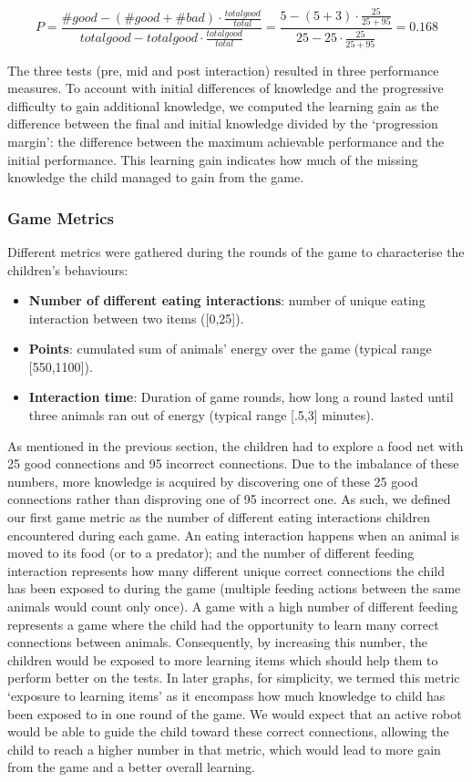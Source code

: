 \begin{equation}
P=\frac{\#good-(\#good+\#bad) \cdot \frac{total good}{total}}{total good - total good \cdot \frac{total good}{total}} = \frac{5-(5+3) \cdot \frac{25}{25+95}}{25 - 25 \cdot \frac{25}{25+95}}=0.168
\end{equation}
			
The three tests (pre, mid and post interaction) resulted in three performance measures. To account with initial differences of knowledge and the progressive difficulty to gain additional knowledge, we computed the learning gain as the difference between the final and initial knowledge divided by the `progression margin': the difference between the maximum achievable performance and the initial performance. This learning gain indicates how much of the missing knowledge the child managed to gain from the game.
			
\subsubsection{Game Metrics}
Different metrics were gathered during the rounds of the game to characterise the children's behaviours:
\begin{itemize}
	\item \textbf{Number of different eating interactions}: number of unique eating interaction between two items ([0,25]).
	\item \textbf{Points}: cumulated sum of animals' energy over the game (typical range [550,1100]).
	\item \textbf{Interaction time}: Duration of game rounds, how long a round lasted until three animals ran out of energy (typical range [.5,3] minutes).
\end{itemize}


As mentioned in the previous section, the children had to explore a food net with 25 good connections and 95 incorrect connections. Due to the imbalance of these numbers, more knowledge is acquired by discovering one of these 25 good connections rather than disproving one of 95 incorrect one. As such, we defined our first game metric as the number of different eating interactions children encountered during each game. An eating interaction happens when an animal is moved to its food (or to a predator); and the number of different feeding interaction represents how many different unique correct connections the child has been exposed to during the game (multiple feeding actions between the same animals would count only once). A game with a high number of different feeding represents a game where the child had the opportunity to learn many correct connections between animals. Consequently, by increasing this number, the children would be exposed to more learning items which should help them to perform better on the tests. In later graphs, for simplicity, we termed this metric `exposure to learning items' as it encompass how much knowledge to child has been exposed to in one round of the game. We would expect that an active robot would be able to guide the child toward these correct connections, allowing the child to reach a higher number in that metric, which would lead to more gain from the game and a better overall learning.

